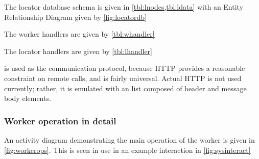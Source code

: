 



The locator database schema is given in \cref{tbl:lnodes,tbl:ldata} with an Entity Relationship Diagram given by \cref{fig:locatordb}




The worker handlers are given by \cref{tbl:whandler}


The locator handlers are given by \cref{tbl:lhandler}


 is used as the communication protocol, because HTTP provides a reasonable constraint on remote calls, and is fairly universal.
Actual HTTP is not used currently; rather, it is emulated with an \R{} list composed of header and message body elements.

\subsubsection{Worker operation in detail}

An activity diagram demonstrating the main operation of the worker is given in \cref{fig:workerops}.
This is seen in use in an example interaction in \cref{fig:sysinteract}


